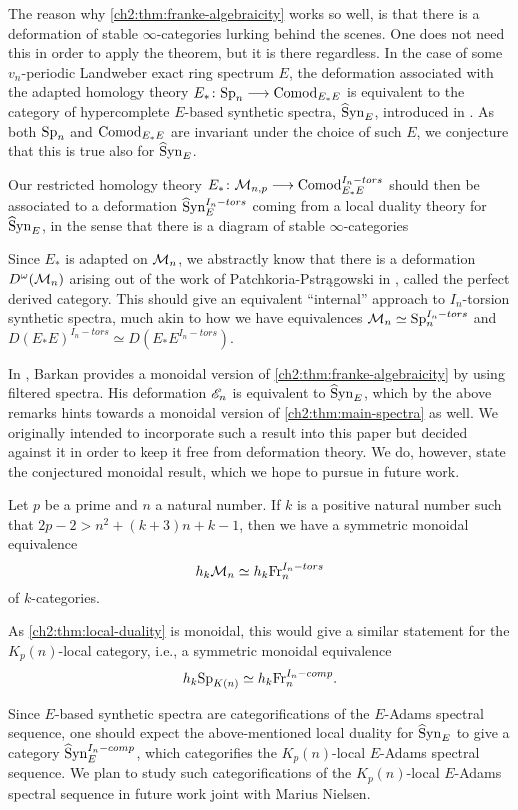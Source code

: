 The reason why \cref{ch2:thm:franke-algebraicity} works so well, is that there is a deformation of stable $\infty$-categories lurking behind the scenes. One does not need this in order to apply the theorem, but it is there regardless. In the case of some $v_n$-periodic Landweber exact ring spectrum $E$, the deformation associated with the adapted homology theory $E_*\colon \mathrm{Sp}_{n} \longrightarrow \mathrm{Comod}_{E_*E}$ is equivalent to the category of hypercomplete $E$-based synthetic spectra, $\widehat{\mathrm{S}}\mathrm{yn}_{E}$, introduced in \cite{pstragowski_2022}. As both $\mathrm{Sp}_{n}$ and $\mathrm{Comod}_{E_*E}$ are invariant under the choice of such $E$, we conjecture that this is true also for $\widehat{\mathrm{S}}\mathrm{yn}_{E}$. 

Our restricted homology theory $E_*\colon \mathcal{M}_{n,p}\longrightarrow \mathrm{Comod}_{E_*E}^{I_n-tors}$ should then be associated to a deformation $\widehat{\mathrm{S}}\mathrm{yn}_{E}^{I_n-tors}$ coming from a local duality theory for $\widehat{\mathrm{S}}\mathrm{yn}_{E}$, in the sense that there is a diagram of stable $\infty$-categories 
\begin{center}
\end{center}
Since $E_*$ is adapted on $\mathcal{M}_{n}$, we abstractly know that there is a deformation $D^\omega(\mathcal{M}_{n})$ arising out of the work of Patchkoria-Pstr{\k a}gowski in \cite{patchkoria-pstragowski_2021}, called the perfect derived category. This should give an equivalent ``internal'' approach to $I_n$-torsion synthetic spectra, much akin to how we have equivalences $\mathcal{M}_{n}\simeq \mathrm{Sp}_{n}^{I_n-tors}$ and $D(E_*E)^{I_n-tors}\simeq D(E_*E^{I_n-tors})$. 

In \cite{barkan_2023}, Barkan provides a monoidal version of \cref{ch2:thm:franke-algebraicity} by using filtered spectra. His deformation $\mathscr{E}_{n}$ is equivalent to $\widehat{\mathrm{S}}\mathrm{yn}_{E}$, which by the above remarks hints towards a monoidal version of \cref{ch2:thm:main-spectra} as well. We originally intended to incorporate such a result into this paper but decided against it in order to keep it free from deformation theory. We do, however, state the conjectured monoidal result, which we hope to pursue in future work.

\begin{conjecture}
    Let $p$ be a prime and $n$ a natural number. If $k$ is a positive natural number such that $2p-2>n^2+(k+3)n+k-1$, then we have a symmetric monoidal equivalence 
    \[h_k \mathcal{M}_{n}\simeq h_k \mathrm{Fr}_{n}^{I_n-tors}\]
    of $k$-categories. 
\end{conjecture}

As \cref{ch2:thm:local-duality} is monoidal, this would give a similar statement for the $K_p(n)$-local category, i.e., a symmetric monoidal equivalence 
\[h_k \mathrm{Sp}_{K(n)}\simeq h_k \mathrm{Fr}_{n}^{I_n-comp}.\]

Since $E$-based synthetic spectra are categorifications of the $E$-Adams spectral sequence, one should expect the above-mentioned local duality for $\widehat{\mathrm{S}}\mathrm{yn}_{E}$ to give a category $\widehat{\mathrm{S}}\mathrm{yn}_{E}^{I_n-comp}$, which categorifies the $K_p(n)$-local $E$-Adams spectral sequence. We plan to study such categorifications of the $K_p(n)$-local $E$-Adams spectral sequence in future work joint with Marius Nielsen. 